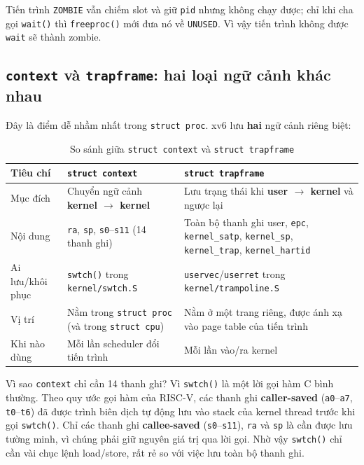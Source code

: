 Tiến trình \texttt{ZOMBIE} vẫn chiếm slot và giữ \texttt{pid} nhưng không chạy được; chỉ khi cha gọi \texttt{wait()} thì \texttt{freeproc()} mới đưa nó về \texttt{UNUSED}. Vì vậy tiến trình không được \texttt{wait} sẽ thành zombie.

\subsection{\texttt{context} và \texttt{trapframe}: hai loại ngữ cảnh khác nhau}

Đây là điểm dễ nhầm nhất trong \texttt{struct proc}. xv6 lưu \textbf{hai} ngữ cảnh riêng biệt:

\begin{table}[H]
    \centering
    \renewcommand{\arraystretch}{1.3}
    \setlength{\tabcolsep}{8pt}
    \begin{tabular}{|p{3cm}|p{5cm}|p{6cm}|}
        \hline
        \rowcolor[rgb]{0.8, 0.9, 1.0}
        \textbf{Tiêu chí} & \textbf{\texttt{struct context}} & \textbf{\texttt{struct trapframe}} \\ \hline
        Mục đích & Chuyển ngữ cảnh \textbf{kernel $\rightarrow$ kernel} & Lưu trạng thái khi \textbf{user $\rightarrow$ kernel} và ngược lại \\ \hline
        Nội dung & \texttt{ra}, \texttt{sp}, \texttt{s0}–\texttt{s11} (14 thanh ghi) & Toàn bộ thanh ghi user, \texttt{epc}, \texttt{kernel\_satp}, \texttt{kernel\_sp}, \texttt{kernel\_trap}, \texttt{kernel\_hartid} \\ \hline
        Ai lưu/khôi phục & \texttt{swtch()} trong \texttt{kernel/swtch.S} & \texttt{uservec}/\texttt{userret} trong \texttt{kernel/trampoline.S} \\ \hline
        Vị trí & Nằm trong \texttt{struct proc} (và trong \texttt{struct cpu}) & Nằm ở một trang riêng, được ánh xạ vào page table của tiến trình \\ \hline
        Khi nào dùng & Mỗi lần scheduler đổi tiến trình & Mỗi lần vào/ra kernel \\ \hline
    \end{tabular}
    \caption{So sánh giữa \texttt{struct context} và \texttt{struct trapframe}}
\end{table}

Vì sao \texttt{context} chỉ cần 14 thanh ghi? Vì \texttt{swtch()} là một lời gọi hàm C bình thường. Theo quy ước gọi hàm của RISC-V, các thanh ghi \textbf{caller-saved} (\texttt{a0}–\texttt{a7}, \texttt{t0}–\texttt{t6}) đã được trình biên dịch tự động lưu vào stack của kernel thread trước khi gọi \texttt{swtch()}. Chỉ các thanh ghi \textbf{callee-saved} (\texttt{s0}–\texttt{s11}), \texttt{ra} và \texttt{sp} là cần được lưu tường minh, vì chúng phải giữ nguyên giá trị qua lời gọi. Nhờ vậy \texttt{swtch()} chỉ cần vài chục lệnh load/store, rất rẻ so với việc lưu toàn bộ thanh ghi.

